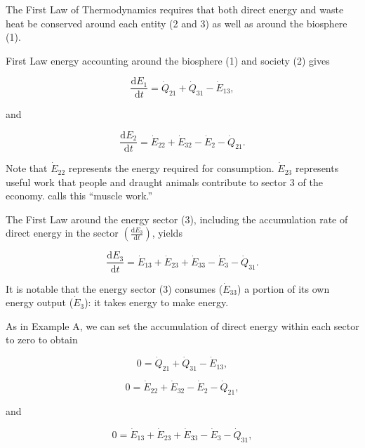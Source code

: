 The First Law of Thermodynamics
requires that both 
direct energy and 
waste heat 
be conserved around each 
entity (2 and 3) as well as around the biosphere (1).

First Law energy accounting around the biosphere (1) and society (2) gives

\begin{equation} \label{eq:CV_E_dot_1}
	\frac{\mathrm{d}E_{1}}{\mathrm{d}t} 	 
	=  \dot{Q}_{21} 
	+ \dot{Q}_{31} 
	- \dot{E}_{13},
\end{equation}

\noindent and 

\begin{equation} \label{eq:CV_E_dot_2}
	\frac{\mathrm{d}E_{2}}{\mathrm{d}t} 	 
	= \dot{E}_{22} 
	+ \dot{E}_{32}
	- \dot{E}_{2}
	- \dot{Q}_{21}.
\end{equation}

Note that $\dot{E}_{22}$ represents the energy required
for consumption. $\dot{E}_{23}$ represents useful work that people
and draught animals contribute to sector 3 of the economy. 
\citep{Ayres} calls this ``muscle work.''

The First Law around the energy sector (3), 
including the accumulation rate of direct energy in the sector 
$\left(\frac{\mathrm{d}E_{3}}{\mathrm{d}t}\right)$, yields

\begin{equation} \label{eq:CV_E_dot_3}
	\frac{\mathrm{d}E_{3}}{\mathrm{d}t} 
	= \dot{E}_{13} 
	+ \dot{E}_{23}
	+ \dot{E}_{33} 
	- \dot{E}_{3} 
	- \dot{Q}_{31}.
\end{equation}

\noindent It is notable that the energy sector (3) consumes ($\dot{E}_{33}$)
a portion of its own energy output ($\dot{E}_3$): it takes energy to make energy.

As in Example A, we can set the accumulation of direct energy 
within each sector to zero to obtain

\begin{equation} \label{eq:CV_E_dot_1_SS}
	0 
	= \dot{Q}_{21} 
	+ \dot{Q}_{31} 
	- \dot{E}_{13},
\end{equation}

\begin{equation} \label{eq:CV_E_dot_2_SS}
	0 
	= \dot{E}_{22} 
	+ \dot{E}_{32}
	- \dot{E}_{2}
	- \dot{Q}_{21},
\end{equation}

\noindent and 

\begin{equation} \label{eq:CV_E_dot_3_SS}
	0 
	= \dot{E}_{13} 
	+ \dot{E}_{23}
	+ \dot{E}_{33} 
	- \dot{E}_{3} 
	- \dot{Q}_{31},
\end{equation}


